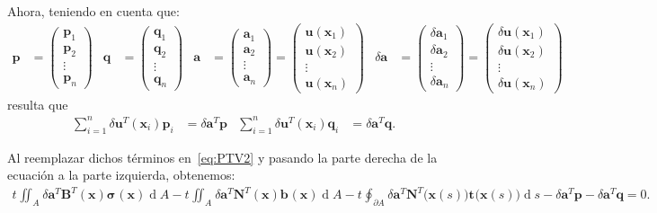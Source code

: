 \documentclass[12pt,letterpaper, landscape]{article}
\newcommand{\e}{{}}
\newcommand{\ve}[1]{{\boldsymbol{#1}}}
\newcommand{\ma}[1]{{\boldsymbol{#1}}}
\newcommand{\dd}{\operatorname{d} \!}
\begin{document}
Ahora, teniendo en cuenta que:
\begin{align}
\ve{p} &= \begin{pmatrix}
\ve{p}_1 \\ \ve{p}_2 \\ \vdots \\ \ve{p}_n
\end{pmatrix}
&
\ve{q} &= \begin{pmatrix}
\ve{q}_1 \\ \ve{q}_2 \\ \vdots \\ \ve{q}_n
\end{pmatrix}
&
\ve{a} &= \begin{pmatrix}
\ve{a}_1 \\ \ve{a}_2 \\ \vdots \\ \ve{a}_n
\end{pmatrix} = 
\begin{pmatrix}
\ve{u}(\ve{x}_1) \\ \ve{u}(\ve{x}_2) \\ \vdots \\ \ve{u}(\ve{x}_n)
\end{pmatrix}
&
\delta\ve{a} &= \begin{pmatrix}
\delta\ve{a}_1 \\ \delta\ve{a}_2 \\ \vdots \\ \delta\ve{a}_n
\end{pmatrix}
 = 
\begin{pmatrix}
\delta\ve{u}(\ve{x}_1) \\ \delta\ve{u}(\ve{x}_2) \\ \vdots \\ \delta\ve{u}(\ve{x}_n)
\end{pmatrix}
\end{align}
resulta que
\begin{align}
\sum_{i=1}^n \delta \ve{u}_\e^T(\ve{x}_i) \ve{p}_i^\e &= \delta\ve{a}^T \ve{p} &\sum_{i=1}^n \delta \ve{u}_\e^T(\ve{x}_i) \ve{q}_i^\e &= \delta\ve{a}^T \ve{q}.
\end{align}

Al reemplazar dichos términos en~\eqref{eq:PTV2} y pasando la parte derecha de la ecuación a la parte izquierda, obtenemos:
\begin{align}
t^\e \iint_{A^\e} \delta\ve{a}^T \ma{B}^T(\ve{x}) \ve{\sigma}^\e(\ve{x}) \dd A - t^\e \iint_{A^\e} \delta\ve{a}^T \ma{N}^T(\ve{x}) \ve{b}^\e(\ve{x}) \dd A 
-  t^\e \oint_{\partial A^\e} \delta\ve{a}^T \ma{N}^T\big(\ve{x}(s)\big) \ve{t}^\e\big(\ve{x}(s)\big) \dd s  
- \delta\ve{a}^T \ve{p} - \delta\ve{a}^T \ve{q} = 0. \label{eq:PTV3}
\end{align}
\end{document}

